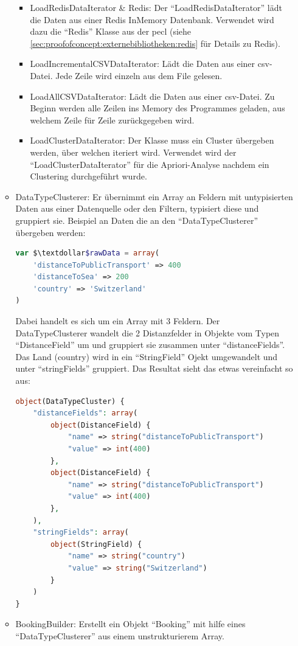\begin{itemize}
\begin{itemize}
				\begin{itemize}
					\item LoadRedisDataIterator \& Redis: Der "`LoadRedisDataIterator"' lädt die Daten aus einer Redis InMemory Datenbank. Verwendet wird dazu die "`Redis"' Klasse aus der \gls{pecl} (siehe \cref{sec:proofofconcept:externebibliotheken:redis}  für Details zu Redis).
					\item LoadIncrementalCSVDataIterator: Lädt die Daten aus einer \gls{csv}-Datei. Jede Zeile wird einzeln aus dem File gelesen.
					\item LoadAllCSVDataIterator: Lädt die Daten aus einer \gls{csv}-Datei. Zu Beginn werden alle Zeilen ins Memory des Programmes geladen, aus welchem Zeile für Zeile zurückgegeben wird.
					\item LoadClusterDataIterator: Der Klasse muss ein Cluster übergeben werden, über welchen iteriert wird. Verwendet wird der "`LoadClusterDataIterator"' für die Apriori-Analyse nachdem ein Clustering durchgeführt wurde.
				\end{itemize}
			\item DataTypeClusterer: Er übernimmt ein Array an Feldern mit untypisierten Daten aus einer Datenquelle oder den Filtern, typisiert diese und gruppiert sie. Beispiel an Daten die an den "`DataTypeClusterer"' übergeben werden:
			\begin{lstlisting}[language=php]
var $\textdollar$rawData = array(
	'distanceToPublicTransport' => 400
	'distanceToSea' => 200
	'country' => 'Switzerland'
)
			\end{lstlisting}
			Dabei handelt es sich um ein Array mit 3 Feldern. Der DataTypeClusterer wandelt die 2 Distanzfelder in Objekte vom Typen "`DistanceField"' um und gruppiert sie zusammen unter "`distanceFields"'. Das Land (country) wird in ein "`StringField"' Ojekt umgewandelt und unter "`stringFields"' gruppiert. Das Resultat sieht das etwas vereinfacht so aus:
			\begin{lstlisting}[language=php]
object(DataTypeCluster) {
	"distanceFields": array(
		object(DistanceField) {
			"name" => string("distanceToPublicTransport")
			"value" => int(400)
		},
		object(DistanceField) {
			"name" => string("distanceToPublicTransport")
			"value" => int(400)
		},
	),
	"stringFields": array(
		object(StringField) {
			"name" => string("country")
			"value" => string("Switzerland")
		}
	)
}
			\end{lstlisting}
			\item BookingBuilder: Erstellt ein Objekt "`Booking"' mit hilfe eines "`DataTypeClusterer"' aus einem unstrukturierem Array.
		\end{itemize}
\end{itemize}

